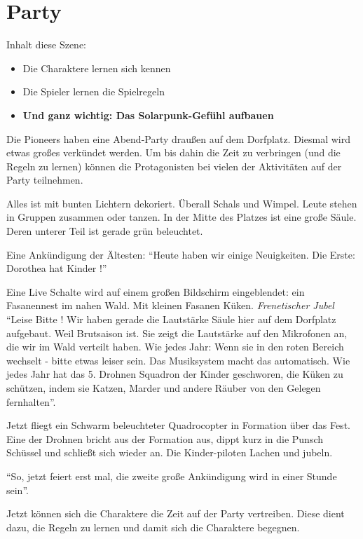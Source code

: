 \section{Party}

Inhalt diese Szene:
\begin{itemize}
\item Die Charaktere lernen sich kennen
\item Die Spieler lernen die Spielregeln
\item \textbf{Und ganz wichtig: Das Solarpunk-Gefühl aufbauen}
\end{itemize}

Die Pioneers haben eine Abend-Party draußen auf dem Dorfplatz. Diesmal wird etwas großes verkündet werden. Um bis dahin die Zeit zu verbringen (und die Regeln zu lernen) können die Protagonisten bei vielen der Aktivitäten auf der Party teilnehmen.

Alles ist mit bunten Lichtern dekoriert. Überall Schals und Wimpel. Leute stehen in Gruppen zusammen oder tanzen. In der Mitte des Platzes ist eine große Säule. Deren unterer Teil ist gerade grün beleuchtet.

Eine Ankündigung der Ältesten: \enquote{Heute haben wir einige Neuigkeiten. Die Erste: Dorothea hat Kinder !}

Eine Live Schalte wird auf einem großen Bildschirm eingeblendet: ein Fasanennest im nahen Wald. Mit kleinen Fasanen Küken. \textit{Frenetischer Jubel} \enquote{Leise Bitte ! Wir haben gerade die Lautstärke Säule hier auf dem Dorfplatz aufgebaut. Weil Brutsaison ist. Sie zeigt die Lautstärke auf den Mikrofonen an, die wir im Wald verteilt haben. Wie jedes Jahr: Wenn sie in den roten Bereich wechselt - bitte etwas leiser sein. Das Musiksystem macht das automatisch. Wie jedes Jahr hat das 5. Drohnen Squadron der Kinder geschworen, die Küken zu schützen, indem sie Katzen, Marder und andere Räuber von den Gelegen fernhalten}.

Jetzt fliegt ein Schwarm beleuchteter Quadrocopter in Formation über das Fest. Eine der Drohnen bricht aus der Formation aus, dippt kurz in die Punsch Schüssel und schließt sich wieder an. Die Kinder-piloten Lachen und jubeln.

\enquote{So, jetzt feiert erst mal, die zweite große Ankündigung wird in einer Stunde sein}.

Jetzt können sich die Charaktere die Zeit auf der Party vertreiben. Diese dient dazu, die Regeln zu lernen und damit sich die Charaktere begegnen.

